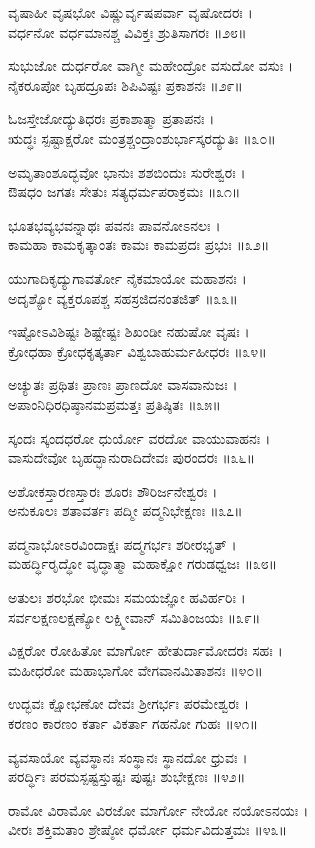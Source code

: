 ವೃಷಾಹೀ ವೃಷಭೋ ವಿಷ್ಣುರ್ವೃಷಪರ್ವಾ ವೃಷೋದರಃ ।\\
ವರ್ಧನೋ ವರ್ಧಮಾನಶ್ಚ ವಿವಿಕ್ತಃ ಶ್ರುತಿಸಾಗರಃ ॥೨೮॥

ಸುಭುಜೋ ದುರ್ಧರೋ ವಾಗ್ಮೀ ಮಹೇಂದ್ರೋ ವಸುದೋ ವಸುಃ ।\\
ನೈಕರೂಪೋ ಬೃಹದ್ರೂಪಃ ಶಿಪಿವಿಷ್ಟಃ ಪ್ರಕಾಶನಃ ॥೨೯॥

ಓಜಸ್ತೇಜೋದ್ಯುತಿಧರಃ ಪ್ರಕಾಶಾತ್ಮಾ ಪ್ರತಾಪನಃ ।\\
ಋದ್ಧಃ ಸ್ಪಷ್ಟಾಕ್ಷರೋ ಮಂತ್ರಶ್ಚಂದ್ರಾಂಶುರ್ಭಾಸ್ಕರದ್ಯುತಿಃ ॥೩೦॥

ಅಮೃತಾಂಶೂದ್ಭವೋ ಭಾನುಃ ಶಶಬಿಂದುಃ ಸುರೇಶ್ವರಃ ।\\
ಔಷಧಂ ಜಗತಃ ಸೇತುಃ ಸತ್ಯಧರ್ಮಪರಾಕ್ರಮಃ ॥೩೧॥

ಭೂತಭವ್ಯಭವನ್ನಾಥಃ ಪವನಃ ಪಾವನೋಽನಲಃ ।\\
ಕಾಮಹಾ ಕಾಮಕೃತ್ಕಾಂತಃ ಕಾಮಃ ಕಾಮಪ್ರದಃ ಪ್ರಭುಃ ॥೩೨॥

ಯುಗಾದಿಕೃದ್ಯುಗಾವರ್ತೋ ನೈಕಮಾಯೋ ಮಹಾಶನಃ ।\\
ಅದೃಶ್ಯೋ ವ್ಯಕ್ತರೂಪಶ್ಚ ಸಹಸ್ರಜಿದನಂತಜಿತ್ ॥೩೩॥

ಇಷ್ಟೋಽವಿಶಿಷ್ಟಃ ಶಿಷ್ಟೇಷ್ಟಃ ಶಿಖಂಡೀ ನಹುಷೋ ವೃಷಃ ।\\
ಕ್ರೋಧಹಾ ಕ್ರೋಧಕೃತ್ಕರ್ತಾ ವಿಶ್ವಬಾಹುರ್ಮಹೀಧರಃ ॥೩೪॥

ಅಚ್ಯುತಃ ಪ್ರಥಿತಃ ಪ್ರಾಣಃ ಪ್ರಾಣದೋ ವಾಸವಾನುಜಃ ।\\
ಅಪಾಂನಿಧಿರಧಿಷ್ಠಾನಮಪ್ರಮತ್ತಃ ಪ್ರತಿಷ್ಠಿತಃ ॥೩೫॥

ಸ್ಕಂದಃ ಸ್ಕಂದಧರೋ ಧುರ್ಯೋ ವರದೋ ವಾಯುವಾಹನಃ ।\\
ವಾಸುದೇವೋ ಬೃಹದ್ಭಾನುರಾದಿದೇವಃ ಪುರಂದರಃ ॥೩೬॥

ಅಶೋಕಸ್ತಾರಣಸ್ತಾರಃ ಶೂರಃ ಶೌರಿರ್ಜನೇಶ್ವರಃ ।\\
ಅನುಕೂಲಃ ಶತಾವರ್ತಃ ಪದ್ಮೀ ಪದ್ಮನಿಭೇಕ್ಷಣಃ ॥೩೭॥

ಪದ್ಮನಾಭೋಽರವಿಂದಾಕ್ಷಃ ಪದ್ಮಗರ್ಭಃ ಶರೀರಭೃತ್ ।\\
ಮಹರ್ದ್ಧಿರೃದ್ಧೋ ವೃದ್ಧಾತ್ಮಾ ಮಹಾಕ್ಷೋ ಗರುಡಧ್ವಜಃ ॥೩೮॥

ಅತುಲಃ ಶರಭೋ ಭೀಮಃ ಸಮಯಜ್ಞೋ ಹವಿರ್ಹರಿಃ ।\\
ಸರ್ವಲಕ್ಷಣಲಕ್ಷಣ್ಯೋ ಲಕ್ಷ್ಮೀವಾನ್ ಸಮಿತಿಂಜಯಃ ॥೩೯॥

ವಿಕ್ಷರೋ ರೋಹಿತೋ ಮಾರ್ಗೋ ಹೇತುರ್ದಾಮೋದರಃ ಸಹಃ ।\\
ಮಹೀಧರೋ ಮಹಾಭಾಗೋ ವೇಗವಾನಮಿತಾಶನಃ ॥೪೦॥

ಉದ್ಭವಃ ಕ್ಷೋಭಣೋ ದೇವಃ ಶ್ರೀಗರ್ಭಃ ಪರಮೇಶ್ವರಃ ।\\
ಕರಣಂ ಕಾರಣಂ ಕರ್ತಾ ವಿಕರ್ತಾ ಗಹನೋ ಗುಹಃ ॥೪೧॥

ವ್ಯವಸಾಯೋ ವ್ಯವಸ್ಥಾನಃ ಸಂಸ್ಥಾನಃ ಸ್ಥಾನದೋ ಧ್ರುವಃ ।\\
ಪರರ್ದ್ಧಿಃ ಪರಮಸ್ಪಷ್ಟಸ್ತುಷ್ಟಃ ಪುಷ್ಟಃ ಶುಭೇಕ್ಷಣಃ ॥೪೨॥

ರಾಮೋ ವಿರಾಮೋ ವಿರಜೋ ಮಾರ್ಗೋ ನೇಯೋ ನಯೋಽನಯಃ ।\\
ವೀರಃ ಶಕ್ತಿಮತಾಂ ಶ್ರೇಷ್ಠೋ ಧರ್ಮೋ ಧರ್ಮವಿದುತ್ತಮಃ ॥೪೩॥

